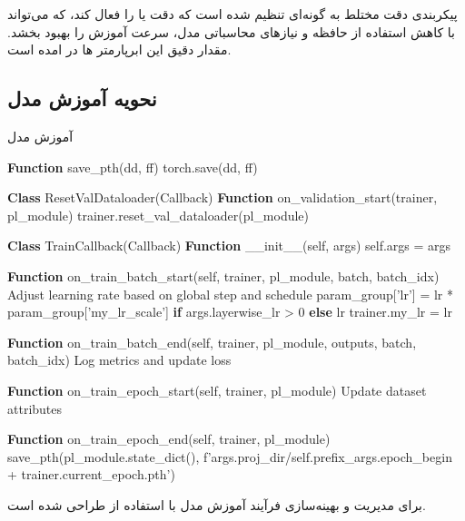 پیکربندی دقت مختلط به گونه‌ای تنظیم شده است که دقت  یا  را فعال کند، که می‌تواند با کاهش استفاده از حافظه و نیازهای محاسباتی مدل، سرعت آموزش را بهبود بخشد. مقدار دقیق این ابرپارمتر ها در  امده است.


\subsection{نحویه آموزش مدل}
\begin{LTR}

      \begin{algorithm}
            \caption{آموزش مدل}
            \label{alg:Training}
            \setmainfont{Times New Roman}
            \begin{algorithmic}[1]
                  \State \textbf{Function} save\_pth(dd, ff)
                  \State torch.save(dd, ff)

                  \State \textbf{Class} ResetValDataloader(Callback)
                  \State \textbf{Function} on\_validation\_start(trainer, pl\_module)
                  \State trainer.reset\_val\_dataloader(pl\_module)

                  \State \textbf{Class} TrainCallback(Callback)
                  \State \textbf{Function} \_\_init\_\_(self, args)
                  \State self.args = args

                  \State \textbf{Function} on\_train\_batch\_start(self, trainer, pl\_module, batch, batch\_idx)
                  \State Adjust learning rate based on global step and schedule
                  \State param\_group['lr'] = lr * param\_group['my\_lr\_scale'] \textbf{if} args.layerwise\_lr > 0 \textbf{else} lr
                  \EndFor
                  \State trainer.my\_lr = lr

                  \State \textbf{Function} on\_train\_batch\_end(self, trainer, pl\_module, outputs, batch, batch\_idx)
                  \State Log metrics and update loss

                  \State \textbf{Function} on\_train\_epoch\_start(self, trainer, pl\_module)
                  \State Update dataset attributes

                  \State \textbf{Function} on\_train\_epoch\_end(self, trainer, pl\_module)
                  \State save\_pth(pl\_module.state\_dict(), f'{args.proj\_dir}/{self.prefix}\_{args.epoch\_begin + trainer.current\_epoch}.pth')
                  \EndIf
            \end{algorithmic}
      \end{algorithm}
\end{LTR}
  برای مدیریت و بهینه‌سازی فرآیند آموزش  مدل
با استفاده از  \cite{Falcon_PyTorch_Lightning_2019}
طراحی شده است.

